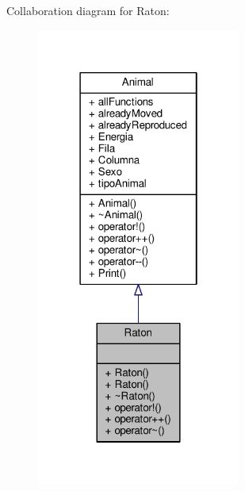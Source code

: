 Collaboration diagram for Raton\+:\nopagebreak
\begin{figure}[H]
\begin{center}
\leavevmode
\includegraphics[width=190pt]{classRaton__coll__graph}
\end{center}
\end{figure}
